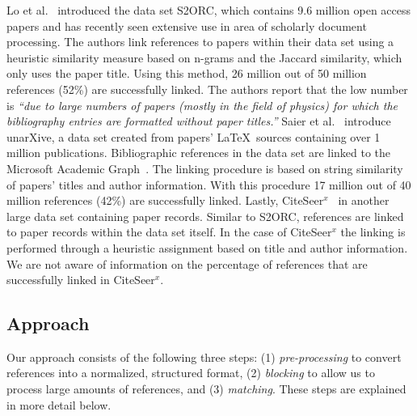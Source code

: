 %
Lo et al.~\cite{Lo2020} introduced the data set S2ORC, which contains 9.6 million open access papers and has recently seen extensive use in area of scholarly document processing. The authors link references to papers within their data set using a heuristic similarity measure based on n-grams and the Jaccard similarity, which only uses the paper title. Using this method, 26 million out of 50 million references  (52\%) are successfully linked. The authors report that the low number is \textit{``due to large numbers of papers (mostly in the field of physics) for which the bibliography entries are formatted without paper titles.''} Saier et al.~\cite{Saier2020} introduce unarXive, a data set created from papers' \LaTeX\ sources containing over 1 million publications. Bibliographic references in the data set are linked to the Microsoft Academic Graph~\cite{Sinha2015,Wang2019}. The linking procedure is based on string similarity of papers' titles and author information. With this procedure 17 million out of 40 million references (42\%) are successfully linked.
Lastly, CiteSeer$^x$~\cite{CiteSeerX2015,CiteSeerX2019} in another large data set containing paper records. Similar to S2ORC, references are linked to paper records within the data set itself. In the case of CiteSeer$^x$ the linking is performed through a heuristic assignment based on title and author information.  We are not aware of information on the percentage of references that are successfully linked in CiteSeer$^x$.


\subsection{Approach}

Our approach consists of the following three steps: (1) \emph{pre-processing} to convert references into a normalized, structured format, (2) \emph{blocking} to allow us to process large amounts of references, and (3) \emph{matching}. These steps are explained in more detail below.

